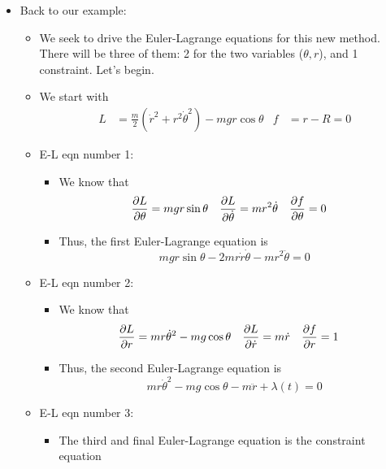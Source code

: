 \documentclass[../notes.tex]{subfiles}
\begin{document}
\begin{itemize}
    \item Back to our example:
    \begin{itemize}
        \item We seek to drive the Euler-Lagrange equations for this new method. There will be three of them: 2 for the two variables ($\theta,r$), and 1 constraint. Let's begin.
        \item We start with
        \begin{align*}
            L &= \frac{m}{2}(\dot{r}^2+r^2\dot{\theta}^2)-mgr\cos\theta&
            f &= r-R = 0
        \end{align*}
        \item E-L eqn number 1:
        \begin{itemize}
            \item We know that
            \begin{align*}
                \pdv{L}{\theta} &= mgr\sin\theta&
                \pdv{L}{\dot{\theta}} &= mr^2\dot{\theta}&
                \pdv{f}{\theta} &= 0
            \end{align*}
            \item Thus, the first Euler-Lagrange equation is
            \begin{equation*}
                mgr\sin\theta-2mr\dot{r}\dot{\theta}-mr^2\ddot{\theta} = 0
            \end{equation*}
        \end{itemize}
        \item E-L eqn number 2:
        \begin{itemize}
            \item We know that
            \begin{align*}
                \pdv{L}{r} &= mr\dot{\theta}^2-mg\cos\theta&
                \pdv{L}{\dot{r}} &= m\dot{r}&
                \pdv{f}{r} &= 1
            \end{align*}
            \item Thus, the second Euler-Lagrange equation is
            \begin{equation*}
                mr\dot{\theta}^2-mg\cos\theta-m\ddot{r}+\lambda(t) = 0
            \end{equation*}
        \end{itemize}
        \item E-L eqn number 3:
        \begin{itemize}
            \item The third and final Euler-Lagrange equation is the constraint equation

\end{itemize}
\end{itemize}
\end{itemize}
\end{document}

